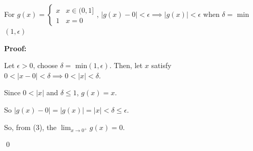 \documentclass{article}
\begin{document}
For $g(x) =
	\begin{cases}
		x & x \in (0,1] \\
		1 & x=0
	\end{cases} $,
$|g(x)-0|<\epsilon \implies |g(x)|<\epsilon$ when $\delta=$ min$(1, \epsilon)$

\textbf{Proof:}

Let $\epsilon > 0$, choose $\delta=$ min$(1, \epsilon)$.
Then, let $x$ satisfy $0<|x-0|<\delta \implies 0 < |x| < \delta$.

Since $0<|x|$ and $\delta \le 1$, $g(x)=x$.

So $|g(x)-0| = |g(x)|=|x|<\delta \le \epsilon$.

So, from (3), the $\lim_{x \to 0^+}g(x)=0$.

\qed
\end{document}

